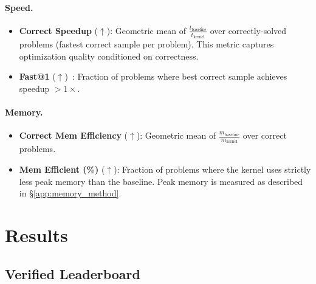 \documentclass[11pt]{article}
\begin{document}
\paragraph{Speed.}
\begin{itemize}[nosep]
\item \textbf{Correct Speedup} ($\uparrow$): Geometric mean of $\frac{t_{\text{baseline}}}{t_{\text{kernel}}}$ over correctly-solved problems (fastest correct sample per problem). This metric captures optimization quality conditioned on correctness.
\item \textbf{Fast@1} ($\uparrow$)~\cite{kernelbench}: Fraction of problems where best correct sample achieves speedup $>1\times$.
\end{itemize}

\paragraph{Memory.}
\begin{itemize}[nosep]
\item \textbf{Correct Mem Efficiency} ($\uparrow$): Geometric mean of $\frac{m_{\text{baseline}}}{m_{\text{kernel}}}$ over correct problems.
\item \textbf{Mem Efficient (\%)} ($\uparrow$): Fraction of problems where the kernel uses strictly less peak memory than the baseline. Peak memory is measured as described in \S\ref{app:memory_method}.
\end{itemize}


\section{Results}
\label{sec:results}

\subsection{Verified Leaderboard}
\end{document}
